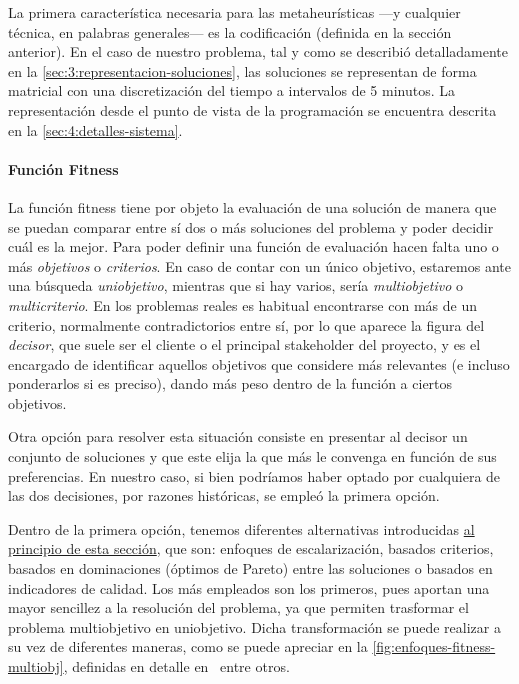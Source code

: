La primera característica necesaria para las metaheurísticas ---y cualquier técnica, en palabras generales--- es la codificación (definida en la sección anterior). En el caso de nuestro problema, tal y como se describió detalladamente en la \autoref{sec:3:representacion-soluciones}, las soluciones se representan de forma matricial con una discretización del tiempo a intervalos de 5 minutos. La representación desde el punto de vista de la programación se encuentra descrita en la \autoref{sec:4:detalles-sistema}.




\paragraph{Función Fitness} \label{apartado:adaptacion-fitness}

La función fitness tiene por objeto la evaluación de una solución de manera que se puedan comparar entre sí dos o más soluciones del problema y poder decidir cuál es la mejor. Para poder definir una función de evaluación hacen falta uno o más \textit{objetivos} o \textit{criterios}. En caso de contar con un único objetivo, estaremos ante una búsqueda \textit{uniobjetivo}, mientras que si hay varios, sería \textit{multiobjetivo} o \textit{multicriterio}. En los problemas reales es habitual encontrarse con más de un criterio, normalmente contradictorios entre sí, por lo que aparece la figura del \textit{decisor}, que suele ser el cliente o el principal stakeholder del proyecto, y es el encargado de identificar aquellos objetivos que considere más relevantes (e incluso ponderarlos si es preciso), dando más peso dentro de la función a ciertos objetivos.

Otra opción para resolver esta situación consiste en presentar al decisor un conjunto de soluciones y que este elija la que más le convenga en función de sus preferencias. En nuestro caso, si bien podríamos haber optado por cualquiera de las dos decisiones, por razones históricas, se empleó la primera opción.

Dentro de la primera opción, tenemos diferentes alternativas introducidas \hyperref[sec:3:metaheurística]{al principio de esta sección}, que son: enfoques de escalarización, basados criterios, basados en dominaciones (óptimos de Pareto) entre las soluciones o basados en indicadores de calidad. Los más empleados son los primeros, pues aportan una mayor sencillez a la resolución del problema, ya que permiten trasformar el problema multiobjetivo en uniobjetivo. Dicha transformación se puede realizar a su vez de diferentes maneras, como se puede apreciar en la \autoref{fig:enfoques-fitness-multiobj}, definidas en detalle en~\cite{sota:metaheuristicas-design-impl} entre otros.

